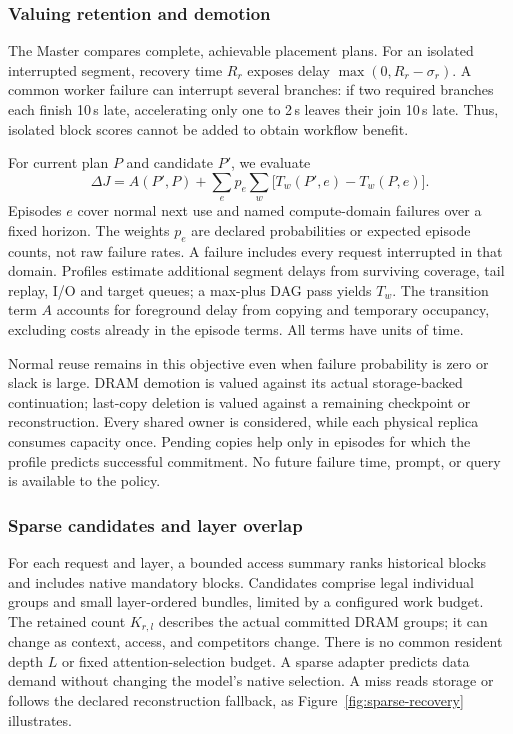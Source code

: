 \subsubsection{Valuing retention and demotion}
\label{sec:placement-value}

The Master compares complete, achievable placement plans. For an isolated
interrupted segment, recovery time $R_r$ exposes delay
$\max(0,R_r-\sigma_r)$. A common worker failure can interrupt several
branches: if two required branches each finish 10\,s late, accelerating
only one to 2\,s leaves their join 10\,s late. Thus, isolated block scores
cannot be added to obtain workflow benefit.

For current plan $P$ and candidate $P'$, we evaluate
\begin{equation}
 \Delta J=A(P',P)+\sum_e p_e\sum_w
       \bigl[T_w(P',e)-T_w(P,e)\bigr].
 \label{eq:value}
\end{equation}
Episodes $e$ cover normal next use and named compute-domain failures over
a fixed horizon. The weights $p_e$ are declared probabilities or expected
episode counts, not raw failure rates. A failure includes every request
interrupted in that domain. Profiles estimate additional segment delays
from surviving coverage, tail replay, I/O and target queues; a max-plus
DAG pass yields $T_w$. The transition term $A$ accounts for foreground
delay from copying and temporary occupancy, excluding costs already in
the episode terms. All terms have units of time.

Normal reuse remains in this objective even when failure probability is
zero or slack is large. DRAM demotion is valued against its actual
storage-backed continuation; last-copy deletion is valued against a
remaining checkpoint or reconstruction. Every shared owner is considered,
while each physical replica consumes capacity once. Pending copies help
only in episodes for which the profile predicts successful commitment.
No future failure time, prompt, or query is available to the policy.

\subsubsection{Sparse candidates and layer overlap}
\label{sec:sparse-placement}

For each request and layer, a bounded access summary ranks historical
blocks and includes native mandatory blocks. Candidates comprise legal
individual groups and small layer-ordered bundles, limited by a configured
work budget. The retained count $K_{r,l}$ describes the actual committed
DRAM groups; it can change as context, access, and competitors change.
There is no common resident depth $L$ or fixed attention-selection budget.
A sparse adapter predicts data demand without changing the model's native
selection. A miss reads storage or follows the declared reconstruction
fallback, as Figure~\ref{fig:sparse-recovery} illustrates.

